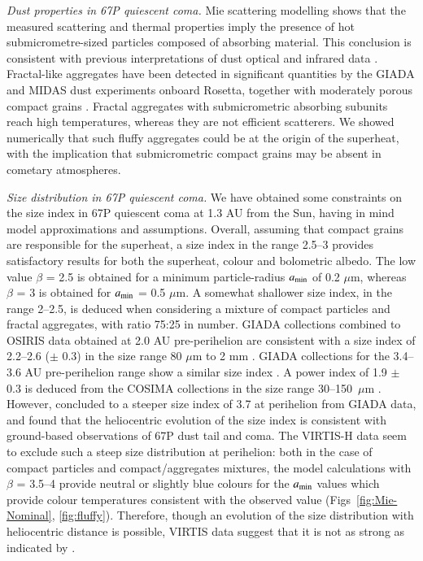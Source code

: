 \documentclass[a4paper,fleqn,usenatbib]{mnras}
\begin{document}
{\it Dust properties in 67P quiescent coma.} Mie scattering modelling shows that the measured scattering and thermal properties imply the presence of hot submicrometre-sized  particles composed of absorbing material. This conclusion is consistent with previous interpretations of dust optical and infrared data \citep[e.g.,][and references therein]{Hanner2003,Kolokolova2004}. Fractal-like aggregates have been detected in significant quantities by the GIADA and MIDAS dust experiments onboard Rosetta, together with moderately porous compact grains \citep{Fulle2015,Bentley2016,Mannel2016}. Fractal aggregates with submicrometric absorbing subunits reach high temperatures, whereas they are not efficient scatterers. We showed numerically that such fluffy aggregates could be at the origin of the superheat, with the implication that submicrometric compact grains may be absent in cometary atmospheres. 


{\it Size distribution in 67P quiescent coma.}  We have
obtained some constraints on the size index in 67P quiescent coma
at 1.3 AU from the Sun, having in mind model approximations and
assumptions. Overall, assuming that compact grains are responsible
for the superheat, a size index in the range 2.5--3 provides
satisfactory results for both the superheat, colour and bolometric
albedo. The low value $\beta$ = 2.5 is obtained for a minimum
particle-radius $a_{\rm min}$ of 0.2 $\mu$m, whereas $\beta$ = 3
is obtained for $a_{\rm min}$ = 0.5 $\mu$m. A somewhat shallower
size index, in the range 2--2.5, is deduced when considering a
mixture of compact particles and fractal aggregates, with ratio
75:25 in number. GIADA collections combined to OSIRIS data
obtained at 2.0 AU pre-perihelion are consistent with a size index
of 2.2--2.6 ($\pm$ 0.3) in the size range 80 $\mu$m to 2 mm
\citep{Rinaldi2017b}. GIADA collections for the 3.4--3.6 AU
pre-perihelion range show a similar size index \citep[$\sim$
2,][]{Rotundi2015}. A power index of 1.9 $\pm$ 0.3 is deduced from
the COSIMA collections in the size range 30--150~$\mu$m
\citep{Merouane2016}. However, \citet{Fulle2016b} concluded to a
steeper size index of 3.7 at perihelion from GIADA data, and found
that the heliocentric evolution of the size index is consistent
with ground-based observations of 67P dust tail and coma. The
VIRTIS-H data seem to exclude such a steep size distribution at
perihelion: both in the case of compact particles and
compact/aggregates mixtures, the model calculations with $\beta$ =
3.5--4 provide neutral or slightly blue colours for the $a_{\rm
min}$ values which provide colour temperatures consistent with the
observed value (Figs~\ref{fig:Mie-Nominal}, \ref{fig:fluffy}).
Therefore, though an evolution of the size distribution with
heliocentric distance is possible, VIRTIS data suggest that it is
not as strong as indicated by \citet{Fulle2016b}.
\end{document}
